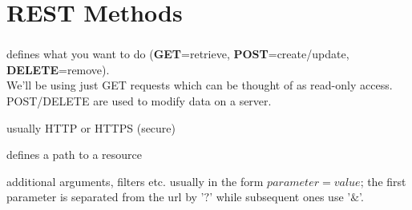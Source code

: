 \documentclass[a4paper,10pt,xcolor=pdftex,dvipsnames,table]{beamer}
\begin{document}
\section{REST Methods}
\begin{frame}[t]\frametitle{\insertsection{}}
\note{}
\begin{block}{}
\begin{description}{}
    \item<+->[\alert<1>{Method}] defines what you want to do (\textbf{GET}=retrieve, \textbf{POST}=create/update, \textbf{DELETE}=remove).\\
    {\scriptsize We'll be using just GET requests which can be thought of as read-only access. POST/DELETE are used to modify data on a server.}
    \item<+->[\alert<2>{Protocol}] usually HTTP or HTTPS (secure)
    \item<+->[\alert<3>{URL}] defines a path to a resource
    \item<+->[\alert<4>{Parameters}] additional arguments, filters etc. usually in the form $parameter=value$; the first parameter is separated from the url by '$?$' while subsequent ones use '$\&$'.
    \end{description}
    \end{block}
\end{frame}
\end{document}
